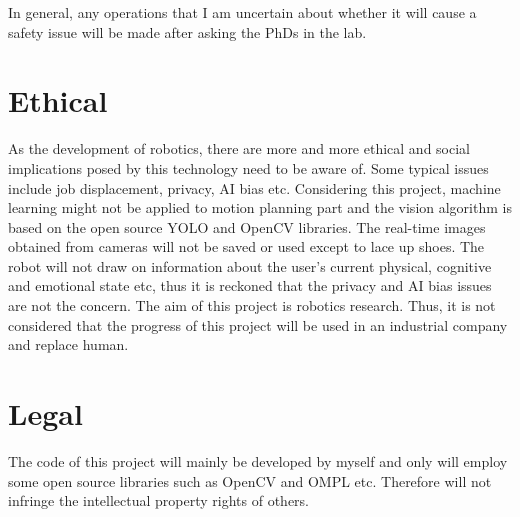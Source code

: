 In general, any operations that I am uncertain about whether it will cause a safety issue will be made after asking the PhDs in the lab. 

\section{Ethical}
As the development of robotics, there are more and more ethical and social implications posed by this technology need to be aware of. Some typical issues include job displacement, privacy, AI bias etc. Considering this project, machine learning might not be applied to motion planning part and the vision algorithm is based on the open source YOLO and OpenCV libraries. The real-time images obtained from cameras will not be saved or used except to lace up shoes. The robot will not draw on information about the user’s current physical, cognitive and emotional state etc, thus it is reckoned that the privacy and AI bias issues are not the concern. The aim of this project is robotics research. Thus, it is not considered that the progress of this project will be used in an industrial company and replace human. 

\section{Legal}
The code of this project will mainly be developed by myself and only will employ some open source libraries such as OpenCV and OMPL etc. Therefore will not infringe the intellectual property rights of others.